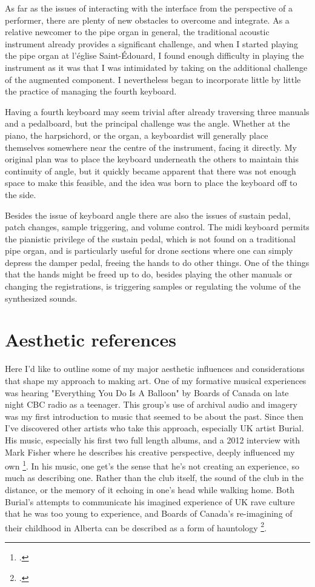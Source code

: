 \documentclass[12pt,twoside,maitrise]{dms_ks}
\theoremstyle{definition}
\begin{document}
As far as the issues of interacting with the interface from the perspective of a performer, there are plenty of new obstacles to overcome and integrate. 
As a relative newcomer to the pipe organ in general, the traditional acoustic instrument already provides a significant challenge, and when I started playing the pipe organ at l’église Saint-Édouard, I found enough difficulty in playing the instrument as it was that I was intimidated by taking on the additional challenge of the augmented component. 
I nevertheless began to incorporate little by little the practice of managing the fourth keyboard. 

Having a fourth keyboard may seem trivial after already traversing three manuals and a pedalboard, but the principal challenge was the angle. 
Whether at the piano, the harpsichord, or the organ, a keyboardist will generally place themselves somewhere near the centre of the instrument, facing it directly. 
My original plan was to place the keyboard underneath the others to maintain this continuity of angle, but it quickly became apparent that there was not enough space to make this feasible, and the idea was born to place the keyboard off to the side. 

Besides the issue of keyboard angle there are also the issues of sustain pedal, patch changes, sample triggering, and volume control. 
The midi keyboard permits the pianistic privilege of the sustain pedal, which is not found on a traditional pipe organ, and is particularly useful for drone sections where one can simply depress the damper pedal, freeing the hands to do other things. 
One of the things that the hands might be freed up to do, besides playing the other manuals or changing the registrations, is triggering samples or regulating the volume of the synthesized sounds. 

\section{Aesthetic references}

Here I'd like to outline some of my major aesthetic influences and considerations that shape my approach to making art. 
One of my formative musical experiences was hearing "Everything You Do Is A Balloon" by Boards of Canada on late night CBC radio as a teenager. 
This group's use of archival audio and imagery was my first introduction to music that seemed to be about the past. 
Since then I've discovered other artists who take this approach, especially UK artist Burial. 
His music, especially his first two full length albums, and a 2012 interview with Mark Fisher where he describes his creative perspective, deeply influenced my own \footcite{fisher_burial_2012}. 
In his music, one get's the sense that he's not creating an experience, so much as describing one. 
Rather than the club itself, the sound of the club in the distance, or the memory of it echoing in one's head while walking home. 
Both Burial's attempts to communicate his imagined experience of UK rave culture that he was too young to experience, and Boards of Canada's re-imagining of their childhood in Alberta can be described as a form of hauntology \footcite{alary_vers_2020}.
\end{document}
